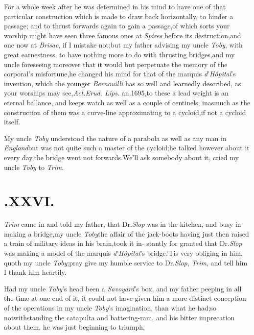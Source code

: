 \documentclass{article}
\begin{document}
For a whole week after he was determined in his mind to have one
of that particular construction which is made to draw back
horizontally, to hinder a passage; and to thrust forwards again to
gain a passage,\tsk of which sorts your worship might have seen
three famous ones at \textit{Spires} before its destruction,\tsk and
one now at \textit{Brisac}, if I mistake not;\tsk but my father
advising my uncle \textit{Toby}, with great earnestness, to have
nothing more to do with thrusting bridges,\tsk and my uncle
foreseeing moreover that it would but perpetuate the memory of the
corporal’s misfortune,\tsk he changed his mind for that of
the marquis \textit{d}’\textit{Hôpital}’s invention,
which the younger \textit{Bernouilli} has so well and learnedly
described, as your worships may see,\tsh \textit{Act.\@ Erud.\@
Lips.\@} an.\@ 1695,\tsk to these a lead weight is an eternal
ballance, and keeps watch as well as a couple of centinels, inasmuch
as the construction of them was a curve-line approximating to a
cycloid,\tsh if not a cycloid itself.

My uncle \textit{Toby} understood the nature of a parabola as well
as any man in \textit{England}\tsk but was not quite such a master
of the cycloid;\tsk he talked however about it every
day,\tsh the bridge went not
forwards.\tsh We’ll ask somebody about it, cried my
uncle \textit{Toby} to \textit{Trim}.

\section{.\quad  XXVI.}

 \textit{Trim} came in and told my
father, that Dr.\@ \textit{Slop} was in the\break
kitchen, and busy in making a bridge,\tsk my uncle
\textit{Toby}\tsh the affair of the jack-boots having just then
raised a train of military ideas in his brain,\tsh took it
in-
stantly for granted that Dr.\@ \textit{Slop} was making a model
of the marquis \textit{d}’\textit{Hôpital}’s bridge.\tsh ’Tis
very obliging in him, quoth my uncle \textit{Toby};\tsk pray
give my humble service to Dr.\@ \textit{Slop}, \textit{Trim},
and tell him I thank him heartily.

Had my uncle \textit{Toby}’s head been a \textit{Sa\-voyard}’s
box, and my father peeping in all the time at one end of it,\tsk
it could not have given him a more distinct conception of the
operations in my uncle \textit{Toby}’s imagination, than what he
had;\break so notwithstanding the catapulta and bat\-tering-ram, and
his bitter imprecation\break
about them, he was just beginning to
triumph,\tsh
\end{document}
